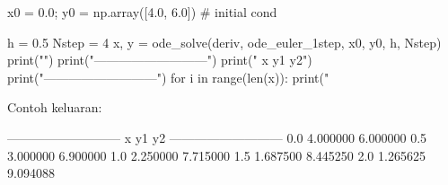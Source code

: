 \begin{frame}[fragile]
\begin{pythoncode}
x0 = 0.0; y0 = np.array([4.0, 6.0]) # initial cond

h = 0.5
Nstep = 4
x, y = ode_solve(deriv, ode_euler_1step, x0, y0, h, Nstep)
print("")
print("---------------------------")
print(" x         y1         y2")
print("---------------------------")
for i in range(len(x)):
    print("%
\end{pythoncode}

Contoh keluaran:
\begin{textcode}
---------------------------
   x       y1         y2
---------------------------
  0.0   4.000000   6.000000
  0.5   3.000000   6.900000
  1.0   2.250000   7.715000
  1.5   1.687500   8.445250
  2.0   1.265625   9.094088
\end{textcode}


\end{frame}

